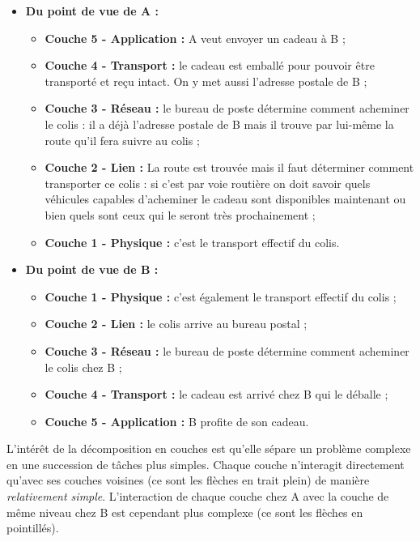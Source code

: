 \begin{itemize}
    \item 	\textbf{Du point de vue de A :}
          \begin{itemize}
              \item 	\textbf{Couche 5 - Application : } A veut envoyer un cadeau à B ;
              \item 	\textbf{Couche 4 - Transport :} le cadeau est emballé pour pouvoir être transporté et reçu intact. On y met aussi l'adresse postale de B ;
              \item 	\textbf{Couche 3 - Réseau :} le bureau  de poste détermine comment acheminer le colis : il a déjà l'adresse postale de B mais il trouve par lui-même la route qu'il fera suivre au colis ;
              \item 	\textbf{Couche 2 - Lien : } La route est trouvée mais il faut déterminer comment transporter ce colis : si c'est par voie routière on doit savoir quels véhicules capables d'acheminer le cadeau sont disponibles maintenant ou bien quels sont ceux qui le seront très prochainement ;
              \item	\textbf{Couche 1 - Physique :} c'est le transport effectif du colis.
          \end{itemize}

    \item 	\textbf{Du point de vue de B :}
          \begin{itemize}
              \item	\textbf{Couche 1 - Physique :} c'est également le transport effectif du colis ;
              \item 	\textbf{Couche 2 - Lien : } le colis arrive au bureau postal ;
              \item 	\textbf{Couche 3 - Réseau :} le bureau  de poste détermine comment acheminer le colis chez B ;
              \item 	\textbf{Couche 4 - Transport :} le cadeau est arrivé chez B qui le déballe ;
              \item 	\textbf{Couche 5 - Application : } B profite de son cadeau.
          \end{itemize}
\end{itemize}

L'intérêt de la décomposition en couches est qu'elle sépare un problème complexe en une succession de tâches plus simples. Chaque couche n'interagit directement qu'avec ses couches voisines (ce sont les flèches en trait plein) de manière \textit{relativement simple}. L'interaction de chaque couche chez A avec la couche de même niveau chez B est cependant plus complexe (ce sont les flèches en pointillés).

